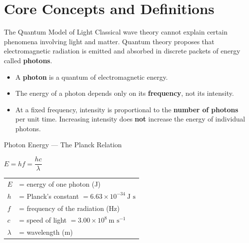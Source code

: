 

\section{Core Concepts and Definitions}

\begin{definitionbox}{The Quantum Model of Light}
Classical wave theory cannot explain certain phenomena involving light and matter. Quantum theory proposes that electromagnetic radiation is emitted and absorbed in discrete packets of energy called \textbf{photons}.
\begin{itemize}[itemsep=2pt]
  \item A \textbf{photon} is a quantum of electromagnetic energy.
  \item The energy of a photon depends only on its \textbf{frequency}, not its intensity.
  \item At a fixed frequency, intensity is proportional to the \textbf{number of photons} per unit time. Increasing intensity does \textbf{not} increase the energy of individual photons.
\end{itemize}
\end{definitionbox}

\begin{formulabox}{Photon Energy — The Planck Relation}
\begin{center}
\Large $E = hf = \dfrac{hc}{\lambda}$
\end{center}
\vspace{0.3em}
\begin{tabular}{@{}ll@{}}
$E$ & = energy of one photon (J) \\
$h$ & = Planck's constant $= 6.63 \times 10^{-34}\ \text{J s}$ \\
$f$ & = frequency of the radiation (Hz) \\
$c$ & = speed of light $= 3.00 \times 10^{8}\ \text{m s}^{-1}$ \\
$\lambda$ & = wavelength (m) \\
\end{tabular}
\end{formulabox}

